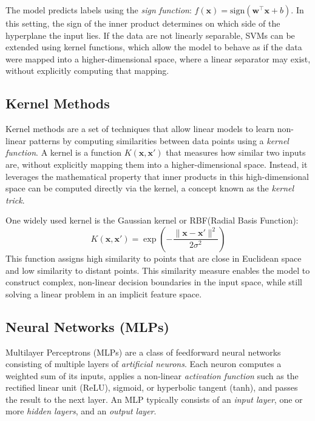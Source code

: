 \documentclass[12pt,a4paper,openany]{report}
\let\parencite\citep
\begin{document}
The model predicts labels using the \textit{sign function}: $f(\mathbf{x}) = \text{sign}(\mathbf{w}^\top \mathbf{x} + b)$. In this setting, the sign of the inner product determines on which side of the hyperplane the input lies. If the data are not linearly separable, SVMs can be extended using kernel functions, which allow the model to behave as if the data were mapped into a higher-dimensional space, where a linear separator may exist, without explicitly computing that mapping.


\subsection{Kernel Methods }
\label{subsec:kernel-methods}
Kernel methods \parencite{scholkopf2002learning} are a set of techniques that allow linear models to learn non-linear patterns by computing similarities between data points using a \textit{kernel function}. A kernel is a function $K(\mathbf{x}, \mathbf{x}')$ that measures how similar two inputs are, without explicitly mapping them into a higher-dimensional space. Instead, it leverages the mathematical property that inner products in this high-dimensional space can be computed directly via the kernel, a concept known as the \textit{kernel trick}.

One widely used kernel is the Gaussian kernel or RBF(Radial Basis Function):
\[
K(\mathbf{x}, \mathbf{x}') = \exp\left(-\frac{\|\mathbf{x} - \mathbf{x}'\|^2}{2\sigma^2}\right)
\]
This function assigns high similarity to points that are close in Euclidean space and low similarity to distant points. This similarity measure enables the model to construct complex, non-linear decision boundaries in the input space, while still solving a linear problem in an implicit feature space.


\subsection{Neural Networks (MLPs)}
Multilayer Perceptrons (MLPs) \parencite{goodfellow2016deep} are a class of feedforward neural networks consisting of multiple layers of \textit{artificial neurons}. Each neuron computes a weighted sum of its inputs, applies a non-linear \textit{activation function} such as the rectified linear unit (ReLU), sigmoid, or hyperbolic tangent (tanh), and passes the result to the next layer. An MLP typically consists of an \textit{input layer}, one or more \textit{hidden layers}, and an \textit{output layer}.
\end{document}
